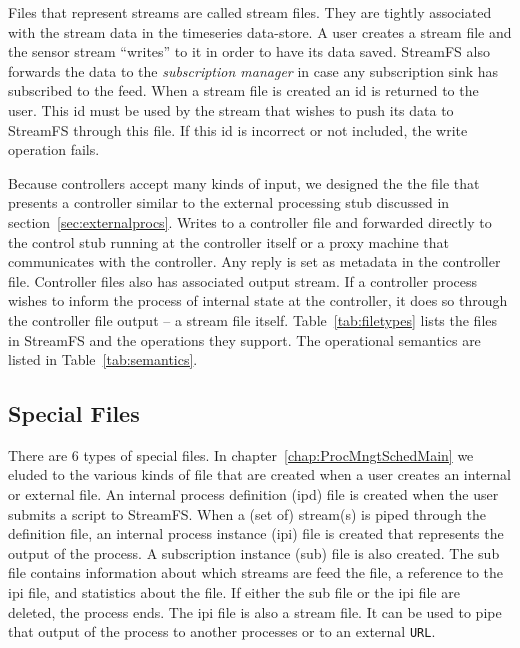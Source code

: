 Files that represent streams are called stream files.  They are tightly associated with the stream data in the timeseries data-store.
A user creates a stream file and the sensor  stream ``writes'' to it in order to have its data saved.  StreamFS also forwards the
data to the \emph{subscription manager} in case any subscription sink has subscribed to the feed.  When a stream file is created an id is 
returned to the user.  This id must be used by the stream that wishes to push its data to StreamFS through this file.  If this id is incorrect
or not included, the write operation fails.

Because controllers accept many kinds of input, we designed the the file that presents a controller similar to the external processing stub discussed
in section~\ref{sec:externalprocs}.  Writes to a controller file and forwarded directly to the control stub running at the controller itself or a proxy
machine that communicates with the controller.  Any reply is set as metadata in the controller file.  Controller files also has associated output stream.
If a controller process wishes to inform the process of internal state at the controller, it does so through the controller file output --
a stream file itself.  Table~\ref{tab:filetypes} lists the files in StreamFS and the operations they support.  The operational semantics
are listed in Table~\ref{tab:semantics}.



\subsection{Special Files}
There are 6 types of special files.  In chapter~\ref{chap:ProcMngtSchedMain} we eluded to the various kinds of file that are created
when a user creates an internal or external file.  An internal process definition (ipd) file is created when the user
submits a script to StreamFS.  When a (set of) stream(s) is piped through the definition file, an internal process instance (ipi) file
is created that represents the output of the process.  A subscription instance (sub) file is also created.  The sub file contains
information about which streams are feed the file, a reference to the ipi file, and statistics about the file.  If either
the sub file or the ipi file are deleted, the process ends.  The ipi file is also a stream file.  It can be used to pipe that
output of the process to another processes or to an external \texttt{URL}.

